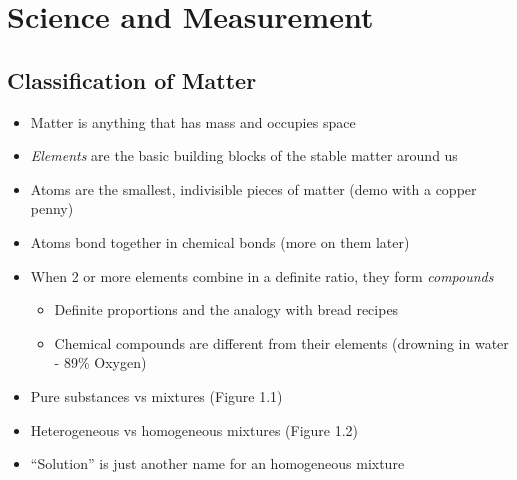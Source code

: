 \documentclass[12pt, openany, letterpaper]{memoir}
\begin{document}
\chapter{Science and Measurement}
\section{Classification of Matter}
\begin{itemize}
	\item Matter is anything that has mass and occupies space
	\item \emph{Elements} are the basic building blocks of the stable matter around us
	\item Atoms are the smallest, indivisible pieces of matter (demo with a copper penny)
	\item Atoms bond together in chemical bonds (more on them later)
	\item When 2 or more elements combine in a definite ratio, they form \emph{compounds}
	      \begin{itemize}
		      \item Definite proportions and the analogy with bread recipes
		      \item Chemical compounds are different from their elements (drowning in water - 89\% Oxygen)
	      \end{itemize}
	\item Pure substances vs mixtures (Figure 1.1)
	\item Heterogeneous vs homogeneous mixtures (Figure 1.2)
	\item ``Solution'' is just another name for an homogeneous mixture
\end{itemize}
\end{document}
